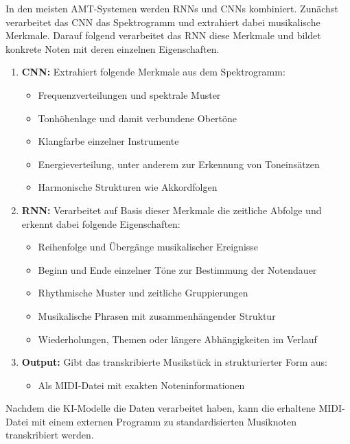 In den meisten AMT-Systemen werden RNNs und CNNs kombiniert.
Zunächst verarbeitet das CNN das Spektrogramm und extrahiert dabei musikalische Merkmale.
Darauf folgend verarbeitet das RNN diese Merkmale und bildet konkrete Noten mit deren einzelnen Eigenschaften.
\begin{enumerate}
    \item \textbf{CNN:} Extrahiert folgende Merkmale aus dem Spektrogramm:
    \begin{itemize}
        \item Frequenzverteilungen und spektrale Muster
        \item Tonhöhenlage und damit verbundene Obertöne
        \item Klangfarbe einzelner Instrumente
        \item Energieverteilung, unter anderem zur Erkennung von Toneinsätzen
        \item Harmonische Strukturen wie Akkordfolgen
    \end{itemize}

    \item \textbf{RNN:} Verarbeitet auf Basis dieser Merkmale die zeitliche Abfolge und erkennt dabei folgende Eigenschaften:
    \begin{itemize}
        \item Reihenfolge und Übergänge musikalischer Ereignisse
        \item Beginn und Ende einzelner Töne zur Bestimmung der Notendauer
        \item Rhythmische Muster und zeitliche Gruppierungen
        \item Musikalische Phrasen mit zusammenhängender Struktur
        \item Wiederholungen, Themen oder längere Abhängigkeiten im Verlauf
    \end{itemize}

    \item \textbf{Output:} Gibt das transkribierte Musikstück in strukturierter Form aus:
    \begin{itemize}
        \item Als MIDI-Datei mit exakten Noteninformationen
    \end{itemize}
\end{enumerate}
Nachdem die KI-Modelle die Daten verarbeitet haben, kann die erhaltene MIDI-Datei mit einem externen Programm
zu standardisierten Musiknoten transkribiert werden.

